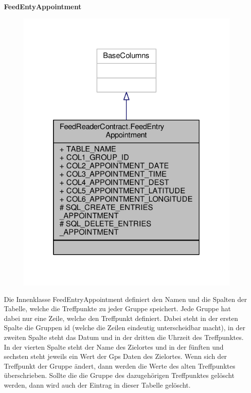 \textbf{FeedEntyAppointment}
\begin{figure}[H]
	\includegraphics[scale = 1]{res/umlClasses/feed_reader_contract_appointment.pdf}
	\centering
\end{figure}
Die Innenklasse FeedEntryAppointment definiert den Namen und die Spalten der Tabelle, welche die Treffpunkte zu jeder Gruppe speichert. Jede Gruppe hat dabei nur eine Zeile, welche den Treffpunkt definiert. 
Dabei steht in der ersten Spalte die Gruppen id (welche die Zeilen eindeutig unterscheidbar macht), in der zweiten Spalte steht das Datum und in der dritten die Uhrzeit des Treffpunktes. In der vierten Spalte steht der Name des Zielortes und in der fünften und sechsten steht jeweils ein Wert der Gps Daten des Zielortes. 
Wenn sich der Treffpunkt der Gruppe ändert, dann werden die Werte des alten Treffpunktes überschrieben.
Sollte die die Gruppe des dazugehörigen Treffpunktes gelöscht werden, dann wird auch der Eintrag in dieser Tabelle gelöscht.
